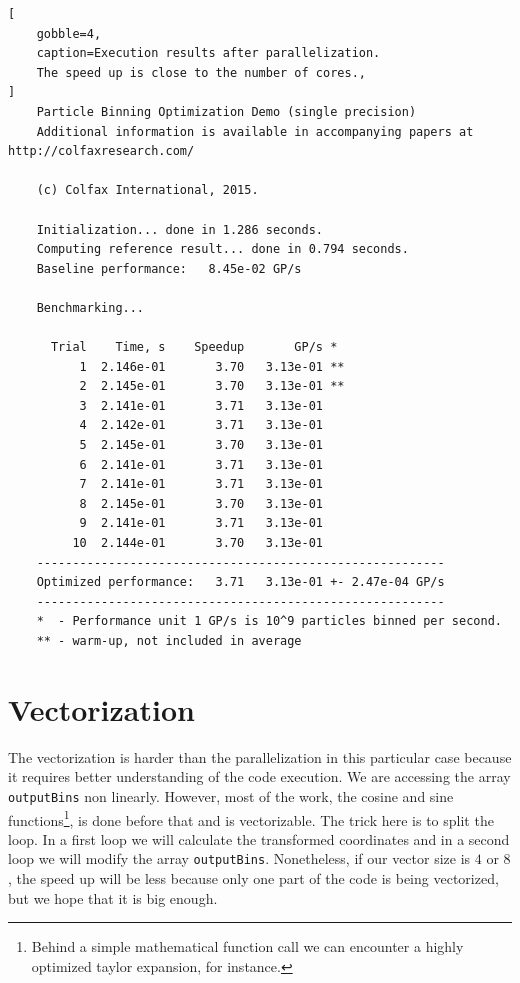 \documentclass[
    12pt, %
]{fphw}
\newcommand{\tech}{\texttt}
\begin{document}
\begin{lstlisting}[
    gobble=4,
    caption=Execution results after parallelization.
    The speed up is close to the number of cores.,
]
    Particle Binning Optimization Demo (single precision)
    Additional information is available in accompanying papers at http://colfaxresearch.com/

    (c) Colfax International, 2015.

    Initialization... done in 1.286 seconds.
    Computing reference result... done in 0.794 seconds.
    Baseline performance:   8.45e-02 GP/s

    Benchmarking...

      Trial    Time, s    Speedup       GP/s *
          1  2.146e-01       3.70   3.13e-01 **
          2  2.145e-01       3.70   3.13e-01 **
          3  2.141e-01       3.71   3.13e-01 
          4  2.142e-01       3.71   3.13e-01 
          5  2.145e-01       3.70   3.13e-01 
          6  2.141e-01       3.71   3.13e-01 
          7  2.141e-01       3.71   3.13e-01 
          8  2.145e-01       3.70   3.13e-01 
          9  2.141e-01       3.71   3.13e-01 
         10  2.144e-01       3.70   3.13e-01 
    ---------------------------------------------------------
    Optimized performance:   3.71   3.13e-01 +- 2.47e-04 GP/s
    ---------------------------------------------------------
    *  - Performance unit 1 GP/s is 10^9 particles binned per second.
    ** - warm-up, not included in average

\end{lstlisting}

\section{Vectorization}

    The vectorization is harder than the parallelization in this particular case
because it requires better understanding of the code execution.
We are accessing the array \tech{outputBins} non linearly.
However, most of the work,
the cosine and sine functions\footnote{
    Behind a simple mathematical function call we can encounter
    a highly optimized taylor expansion, for instance.
}, is done before that and is vectorizable.
The trick here is to split the loop.
In a first loop we will calculate the transformed coordinates
and in a second loop we will modify the array \tech{outputBins}.
Nonetheless, if our vector size is $4$ or $8$,
the speed up will be less because only one part of the code is being vectorized,
but we hope that it is big enough.
\end{document}
